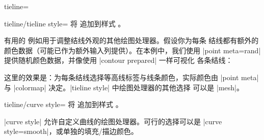 \begin{plottype}{tieline=}
    \begin{pgfplotskey}{tieline/tieline style=}
        将  追加到样式 。

        有用的  例如用于调整结线外观的其他绘图处理器。假设你为每条
        结线都有额外的颜色数据（可能已作为额外输入列提供）。在本例中，我们使用
        |point meta=rand| 提供随机颜色数据，并像使用 |contour prepared| 一样可视化
        各条结线：
\begin{codeexample}[]
\end{codeexample}
        \noindent 这里的效果是：为每条结线选择等高线标签与线条颜色，实际颜色由
        |point meta| 与 |colormap| 决定。|tieline style| 中绘图处理器的其他选择
        可以是 |mesh|。
    \end{pgfplotskey}

    \begin{pgfplotskey}{tieline/curve style=}
        将  追加到样式 。

        |curve style| 允许自定义曲线的绘图处理器。可行的选择可以是
        |curve style={smooth}|，或单独的填充/描边颜色。
    \end{pgfplotskey}
\end{plottype}
\endgroup
